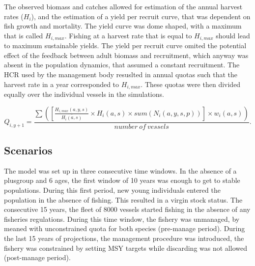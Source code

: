 \documentclass[12pt,oneline,a4paper,numbib]{ouparticle}
\numberwithin{equation}{subsection} %
\begin{document}
The observed biomass and catches allowed for estimation of the annual harvest rates ($H_i$), and the estimation of a yield per recruit curve, that was dependent on fish growth and mortality. The yield curve was dome shaped, with a maximum that is called $H_{i,max}$. Fishing at a harvest rate that is equal to $H_{i,max}$  should lead to maximum sustainable yields. The yield per recruit curve omited the potential effect of the feedback between adult biomass and recruitment, which anyway was absent in the population dynamics, that assumed a constant recruitment. The HCR used by the management body resuslted in annual quotas such that the harvest rate in a year corresponded to $H_{i,max}$. These quotas were then divided equally over the individual vessels in the simulations.  

\begin{equation}
 Q_{i,y+1} = \frac
                {\sum( [\frac{H_{i,max}(a,y,s)}{\bar{H_i(a,s)}} \times H_i(a,s) \times sum( N_i (a, y, s, p))] \times w_i(a,s)) }
                {number\  of\  vessels}.
\end{equation}


\subsection{Scenarios}

The model was set up in three consecutive time windows. In the absence of a plusgroup and 6 ages, the first window of 10 years was enough to get to stable populations. During this first period, new young individuals entered the population in the absence of fishing. This resulted in a virgin stock status. The consecutive 15 years, the fleet of 8000 vessels started fishing in the absence of any fisheries regulations. During this time window, the fishery was unmanaged, by meaned with unconstrained quota for both species (pre-manage period). During the last 15 years of projections, the management procedure was introduced, the fishery was constrained by setting MSY targets while discarding was not allowed (post-manage period). 
      
\end{document}

